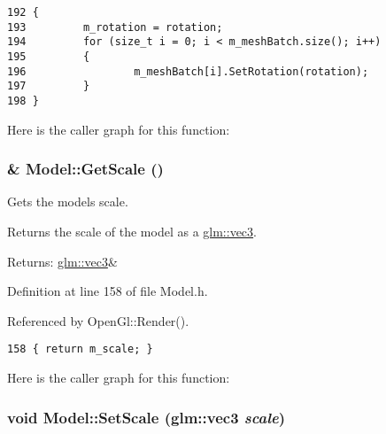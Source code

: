 \begin{Code}\begin{verbatim}192 {
193         m_rotation = rotation;
194         for (size_t i = 0; i < m_meshBatch.size(); i++)
195         {
196                 m_meshBatch[i].SetRotation(rotation);
197         }
198 }
\end{verbatim}
\end{Code}




Here is the caller graph for this function:\hypertarget{class_model_a0fecf0d42fd4ab4d3c4a49a84bd830e}{
\subsubsection[GetScale]{\& Model::GetScale ()}}
\label{class_model_a0fecf0d42fd4ab4d3c4a49a84bd830e}


Gets the models scale. 

Returns the scale of the model as a \hyperlink{group__core__types_g1c47e8b3386109bc992b6c48e91b0be7}{glm::vec3}.

\begin{Desc}
\item[Returns:]\hyperlink{group__core__types_g1c47e8b3386109bc992b6c48e91b0be7}{glm::vec3}\& \end{Desc}


Definition at line 158 of file Model.h.

Referenced by OpenGl::Render().

\begin{Code}\begin{verbatim}158 { return m_scale; }
\end{verbatim}
\end{Code}




Here is the caller graph for this function:\hypertarget{class_model_76860d36c983eb38250588899775aab7}{
\subsubsection[SetScale]{\setlength{\rightskip}{0pt plus 5cm}void Model::SetScale ({\bf glm::vec3} {\em scale})}}
\label{class_model_76860d36c983eb38250588899775aab7}


